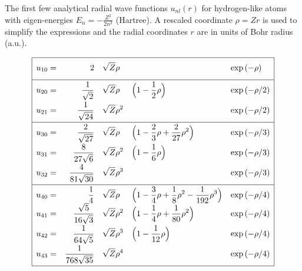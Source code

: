 \begin{table}[h!]
\caption{The first few analytical radial wave functions
$u_{nl}(r)$ for hydrogen-like atoms with eigen-energies $E_n=-\frac{Z^2}{2n^2}$ (Hartree).
A rescaled coordinate $\rho=Zr$ is used to simplify the expressions
and the radial coordinates $r$ are in units of Bohr radius (a.u.).}
\label{table:unl}
\begin{equation*}
\renewcommand\arraystretch{1.8}
\begin{array}{|>{\displaystyle}r >{\displaystyle}r >{\displaystyle}l >{\displaystyle}l >{\displaystyle}l|}
  \hline
  u_{10} = & 2                           & \sqrt{Z}\rho   &                                                                   & \exp{(-\rho)}   \\[0.5em] \hline
  u_{20} = & \frac{1}{\sqrt{2}}          & \sqrt{Z}\rho   & \Big(1-\frac{1}{2}\rho\Big)                                       & \exp{(-\rho/2)} \\
  u_{21} = & \frac{1}{\sqrt{24}}         & \sqrt{Z}\rho^2 &                                                                   & \exp{(-\rho/2)} \\[0.5em] \hline
  u_{30} = & \frac{2}{\sqrt{27}}         & \sqrt{Z}\rho   & \Big(1-\frac{2}{3}\rho+\frac{2}{27}\rho^2\Big)                    & \exp{(-\rho/3)} \\
  u_{31} = & \frac{8}{27\sqrt{6}}        & \sqrt{Z}\rho^2 & \Big(1-\frac{1}{6}\rho\Big)                                       & \exp{(-\rho/3)} \\
  u_{32} = & \frac{4}{81\sqrt{30}}       & \sqrt{Z}\rho^3 &                                                                   & \exp{(-\rho/3)} \\[0.5em] \hline
  u_{40} = & \frac{1}{4}                 & \sqrt{Z}\rho   & \Big(1-\frac{3}{4}\rho+\frac{1}{8}\rho^2-\frac{1}{192}\rho^3\Big) & \exp{(-\rho/4)} \\
  u_{41} = & \frac{\sqrt{5}}{16\sqrt{3}} & \sqrt{Z}\rho^2 & \Big(1-\frac{1}{4}\rho+\frac{1}{80}\rho^2\Big)                    & \exp{(-\rho/4)} \\
  u_{42} = & \frac{1}{64\sqrt{5}}        & \sqrt{Z}\rho^3 & \Big(1-\frac{1}{12}\rho\Big)                                      & \exp{(-\rho/4)} \\
  u_{43} = & \frac{1}{768\sqrt{35}}      & \sqrt{Z}\rho^4 &                                                                   & \exp{(-\rho/4)} \\[0.5em]
  \hline
\end{array}
\end{equation*}
\end{table}

